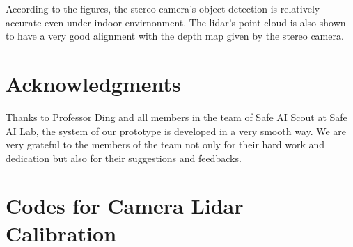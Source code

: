 \documentclass[balance,upint,subscriptcorrection,varvw,nofoot, mathalfa=cal=boondoxo,spanish,french,vietnamese,russian,greek,pdf-a,fontspec,colorlinks]{asmeconf}
\begin{document}
According to the figures, the stereo camera’s object detection is relatively accurate even under indoor
envirnonment. The lidar’s point cloud is also shown to have a very good alignment with the depth map given by
the stereo camera.



\section*{Acknowledgments}

Thanks to Professor Ding and all members in the team of Safe AI Scout at Safe AI Lab, the system of our prototype is developed in a very smooth way. We are very grateful to the members of the team not only for their hard work and dedication but also for their suggestions and feedbacks. 



\nocite{*}%



\appendix


\newpage
\section[Camera Lidar Calibration]{Codes for Camera Lidar Calibration}\label{appendix:a}
\end{document}
